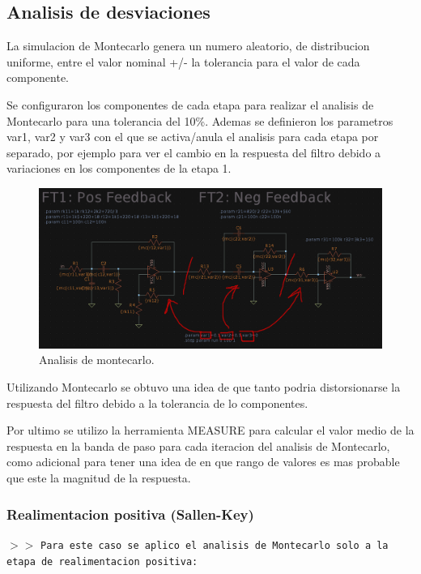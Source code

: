 \subsection{Analisis de desviaciones}

La simulacion de Montecarlo genera un numero aleatorio, de distribucion uniforme, entre el valor nominal +/- la tolerancia para el valor de cada componente.

Se configuraron los componentes de cada etapa para realizar el analisis de Montecarlo para una tolerancia del 10\%. Ademas se definieron los parametros var1, var2 y var3 con el que se activa/anula el analisis para cada etapa por separado, por ejemplo para ver el cambio en la respuesta del filtro debido a variaciones en los componentes de la etapa 1.

\begin{figure}[H]
    \centering
    \includegraphics[scale=.35]{Secciones/Circ1/img/schMontecarlo.png}
    \caption{Analisis de montecarlo.}
    \label{prop}
\end{figure}

Utilizando Montecarlo se obtuvo una idea de que tanto podria distorsionarse la respuesta del filtro debido a la tolerancia de lo componentes. 

Por ultimo se utilizo la herramienta MEASURE para calcular el valor medio de la respuesta en la banda de paso para cada iteracion del analisis de Montecarlo, como adicional para tener una idea de en que rango de valores es mas probable que este la magnitud de la respuesta.

\subsubsection{Realimentacion positiva (Sallen-Key)}

\noindent $>>$ \texttt{Para este caso se aplico el analisis de Montecarlo solo a la etapa de realimentacion positiva:}

